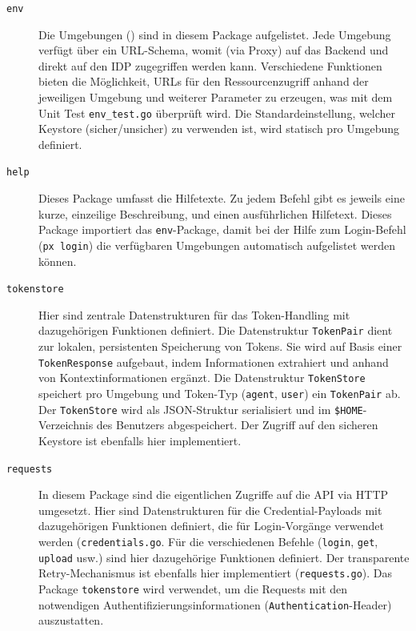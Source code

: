 \begin{description}
    \item[\texttt{env}] Die Umgebungen () sind in diesem Package aufgelistet. Jede Umgebung verfügt über ein URL-Schema, womit (via Proxy) auf das Backend und direkt auf den IDP zugegriffen werden kann. Verschiedene Funktionen bieten die Möglichkeit, URLs für den Ressourcenzugriff anhand der jeweiligen Umgebung und weiterer Parameter zu erzeugen, was mit dem Unit Test \texttt{env\_test.go} überprüft wird. Die Standardeinstellung, welcher Keystore (sicher/unsicher) zu verwenden ist, wird statisch pro Umgebung definiert.
    \item[\texttt{help}] Dieses Package umfasst die Hilfetexte. Zu jedem Befehl gibt es jeweils eine kurze, einzeilige Beschreibung, und einen ausführlichen Hilfetext. Dieses Package importiert das \texttt{env}-Package, damit bei der Hilfe zum Login-Befehl (\texttt{px login}) die verfügbaren Umgebungen automatisch aufgelistet werden können.
    \item[\texttt{tokenstore}] Hier sind zentrale Datenstrukturen für das Token-Handling mit dazugehörigen Funktionen definiert. Die Datenstruktur \texttt{TokenPair} dient zur lokalen, persistenten Speicherung von Tokens. Sie wird auf Basis einer \texttt{TokenResponse} aufgebaut, indem Informationen extrahiert und anhand von Kontextinformationen ergänzt. Die Datenstruktur \texttt{TokenStore} speichert pro Umgebung und Token-Typ (\texttt{agent}, \texttt{user}) ein \texttt{TokenPair} ab. Der \texttt{TokenStore} wird als JSON-Struktur serialisiert und im \texttt{\$HOME}-Verzeichnis des Benutzers abgespeichert. Der Zugriff auf den sicheren Keystore ist ebenfalls hier implementiert.
    \item[\texttt{requests}] In diesem Package sind die eigentlichen Zugriffe auf die API via HTTP umgesetzt. Hier sind Datenstrukturen für die Credential-Payloads mit dazugehörigen Funktionen definiert, die für Login-Vorgänge verwendet werden (\texttt{credentials.go}. Für die verschiedenen Befehle (\texttt{login}, \texttt{get}, \texttt{upload} usw.) sind hier dazugehörige Funktionen definiert. Der transparente Retry-Mechanismus ist ebenfalls hier implementiert (\texttt{requests.go}). Das Package \texttt{tokenstore} wird verwendet, um die Requests mit den notwendigen Authentifizierungsinformationen (\texttt{Authentication}-Header) auszustatten.

\end{description}
